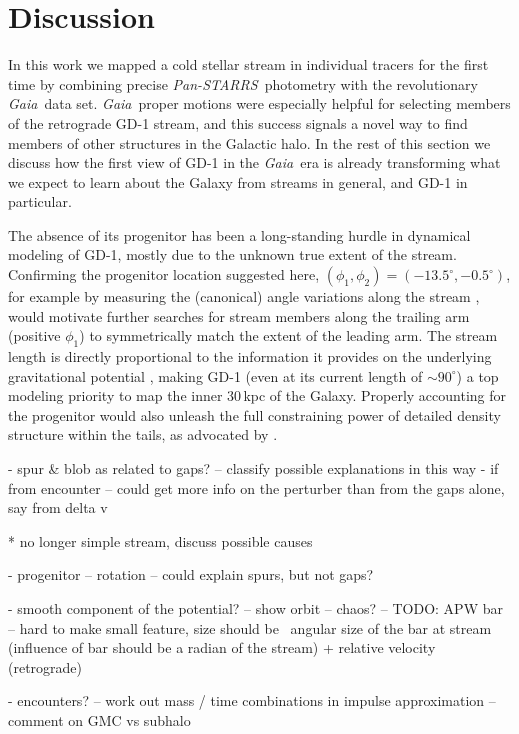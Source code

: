 \documentclass[modern]{aastex62}
\newcommand{\gaia}{\textsl{Gaia}}
\newcommand{\pans}{\textsl{Pan-STARRS}}
\newcommand{\todo}[1]{{\color{red} TODO: #1}}
\begin{document}
\section{Discussion}
\label{sec:discussion}

In this work we mapped a cold stellar stream in individual tracers for the first time by combining precise \pans\ photometry with the revolutionary \gaia\ data set.
\gaia\ proper motions were especially helpful for selecting members of the retrograde GD-1 stream, and this success signals a novel way to find members of other structures in the Galactic halo.
In the rest of this section we discuss how the first view of GD-1 in the \gaia\ era is already transforming what we expect to learn about the Galaxy from streams in general, and GD-1 in particular.

The absence of its progenitor has been a long-standing hurdle in dynamical modeling of GD-1, mostly due to the unknown true extent of the stream.
Confirming the progenitor location suggested here, $(\phi_1, \phi_2) = (-13.5^\circ,-0.5^\circ)$, for example by measuring the (canonical) angle variations along the stream \citep{Bovy:2014}, would motivate further searches for stream members along the trailing arm (positive $\phi_1$) to symmetrically match the extent of the leading arm.
The stream length is directly proportional to the information it provides on the underlying gravitational potential \citep{Bonaca:2018}, making GD-1 (even at its current length of $\sim90^\circ$) a top modeling priority to map the inner 30\,kpc of the Galaxy.
Properly accounting for the progenitor would also unleash the full constraining power of detailed density structure within the tails, as advocated by \citet{Kupper:2015}.


- spur \& blob as related to gaps? -- classify possible explanations in this way
- if from encounter -- could get more info on the perturber than from the gaps alone, say from delta v

* no longer simple stream, discuss possible causes

- progenitor
-- rotation -- could explain spurs, but not gaps?

- smooth component of the potential?
-- show orbit
-- chaos?
-- \todo{APW} bar -- hard to make small feature, size should be ~angular size of the bar at stream (influence of bar should be a radian of the stream) + relative velocity (retrograde)

- encounters?
-- work out mass / time combinations in impulse approximation
-- comment on GMC vs subhalo
\end{document}
